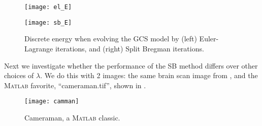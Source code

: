 \begin{figure}[htb!]
	\centering
	\begin{minipage}{0.40\textwidth}
		\texttt{[image: el\_E]}
	\end{minipage}\quad
	\begin{minipage}{0.40\textwidth}
		\texttt{[image: sb\_E]}
	\end{minipage}%
	\caption{Discrete energy when evolving the GCS model by (left) Euler-Lagrange iterations, and (right) Split Bregman iterations.}
	\label{fig:sb_energy}
\end{figure}

Next we investigate whether the performance of the SB method differs over other choices of $\lambda$. We do this with 2 images: the same brain scan image from , and the \textsc{Matlab} favorite, ``cameraman.tif'', shown in .
\begin{figure}[htb!]
	\centering
	\begin{minipage}{0.40\textwidth}
		\texttt{[image: camman]}
	\end{minipage}\quad
	\caption{Cameraman, a \textsc{Matlab} classic.}
	\label{fig:cam}
\end{figure}
